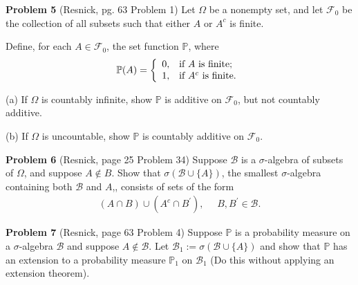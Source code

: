 \documentclass{article}
\begin{document}
\vspace{2 mm}

\noindent \textbf{Problem 5} (Resnick, pg. 63 Problem 1) Let $\Omega$ be a nonempty set, and let $\mathcal{F}_{0}$ be the collection of all subsets such that either $A$ or $A^{c}$ is finite.

\vspace{2 mm}

\noindent Define, for each $A \in \mathcal{F}_{0}$, the set function $\mathbb{P}$, where
\begin{eqnarray*} \mathbb{P}(A) = \left\{
                                    \begin{array}{ll}
                                      0, & \hbox{if $A$ is finite;} \\
                                      1, & \hbox{if $A^{c}$ is finite.}
                                    \end{array}
                                  \right. \end{eqnarray*}

\vspace{2 mm}

\noindent (a) If $\Omega$ is countably infinite, show $\mathbb{P}$ is additive on $\mathcal{F}_{0}$, but not countably additive.

\vspace{2 mm}

\noindent (b) If $\Omega$ is uncountable, show $\mathbb{P}$ is countably additive on $\mathcal{F}_{0}$.

\vspace{2 mm}

\noindent \textbf{Problem 6} (Resnick, page 25 Problem 34) Suppose $\mathcal{B}$ is a $\sigma$-algebra of subsets of $\Omega$, and suppose $A \notin B$.  Show that $\sigma(\mathcal{B} \cup \{A\})$, the smallest $\sigma$-algebra containing both $\mathcal{B}$ and $A$,, consists of sets of the form
\begin{eqnarray*} (A \cap B) \cup (A^{c} \cap B^{'}), ~~~~~~ B, B^{'} \in \mathcal{B}. \end{eqnarray*}

\vspace{2 mm}

\noindent \textbf{Problem 7} (Resnick, page 63 Problem 4) Suppose $\mathbb{P}$ is a probability measure on a $\sigma$-algebra $\mathcal{B}$ and suppose $A \notin \mathcal{B}$.  Let $\mathcal{B}_{1} := \sigma(\mathcal{B} \cup \{A\})$ and show that $\mathbb{P}$ has an extension to a probability measure $\mathbb{P}_{1}$ on $\mathcal{B}_{1}$ (Do this without applying an extension theorem).
\end{document}
